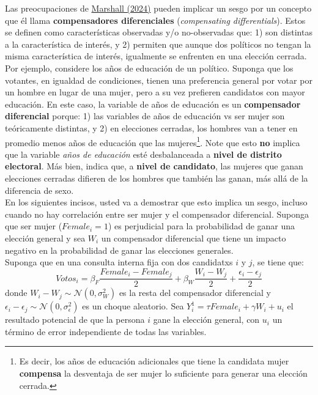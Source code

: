 \documentclass[a4paper, answers, addpoints, 11pt]{exam}
\begin{document}
\bigskip

Las preocupaciones de \href{https://onlinelibrary-wiley-com.ezproxy.uniandes.edu.co/doi/full/10.1111/ajps.12741}{Marshall (2024)} pueden implicar un sesgo por un concepto que él llama \textbf{compensadores diferenciales} (\textit{compensating differentials}). Estos se definen como características observadas y/o no-observadas que: 1) son distintas a la característica de interés, y 2) permiten que aunque dos políticos no tengan la misma característica de interés, igualmente se enfrenten en una elección cerrada. \\

Por ejemplo, considere los años de educación de un político. Suponga que los votantes, en igualdad de condiciones, tienen una preferencia general por votar por un hombre en lugar de una mujer, pero a su vez prefieren candidatos con mayor educación. En este caso, la variable de años de educación es un \textbf{compensador diferencial} porque: 1) las variables de años de educación vs ser mujer son teóricamente distintas, y 2) en elecciones cerradas, los hombres van a tener en promedio menos años de educación que las mujeres\footnote{Es decir, los años de educación adicionales que tiene la candidata mujer \textbf{compensa} la desventaja de ser mujer lo suficiente para generar una elección cerrada.}. Note que esto \textbf{no} implica que la variable \textit{años de educación} esté desbalanceada a \textbf{nivel de distrito electoral}. Más bien, indica que, a \textbf{nivel de candidato}, las mujeres que ganan elecciones cerradas difieren de los hombres que también las ganan, más allá de la diferencia de sexo.  \\

En los siguientes incisos, usted va a demostrar que esto implica un sesgo, incluso cuando no hay correlación entre ser mujer y el compensador diferencial. Suponga que ser mujer ($Female_i = 1$) es perjudicial para la probabilidad de ganar una elección general y sea $W_i$ un compensador diferencial que tiene un impacto negativo en la probabilidad de ganar las elecciones generales. \\

Suponga que en una consulta interna fija con dos candidatxs $i$ y $j$, se tiene que:
\vspace{0.2cm}
\begin{equation}\label{votoscandidatoscompensador}
    Votos_i = \beta_F\frac{Female_i-Female_j}{2}+\beta_W\frac{W_i-W_j}{2}+\frac{\epsilon_i-\epsilon_j}{2}
\end{equation}
\vspace{0.2cm}
donde $W_i-W_j \sim \mathcal{N}(0, \sigma_W^2)$ es la resta del compensador diferencial y $\epsilon_i-\epsilon_j \sim \mathcal{N}( 0, \sigma_\epsilon^2)$ es un choque aleatorio. Sea $Y_i^1 = \tau Female_i + \gamma W_i + u_i$ el resultado potencial de que la persona $i$ gane la elección general, con $u_i$ un término de error independiente de todas las variables.
\end{document}
